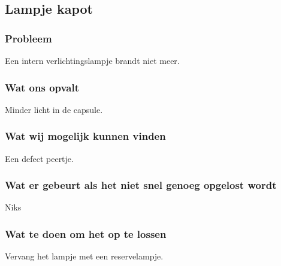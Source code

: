 \subsection{Lampje kapot}

\subsubsection{Probleem}
Een intern verlichtingslampje brandt niet meer.

\subsubsection{Wat ons opvalt}
Minder licht in de capsule.

\subsubsection{Wat wij mogelijk kunnen vinden}
Een defect peertje.

\subsubsection{Wat er gebeurt als het niet snel genoeg opgelost wordt}
Niks

\subsubsection{Wat te doen om het op te lossen}
Vervang het lampje met een reservelampje.